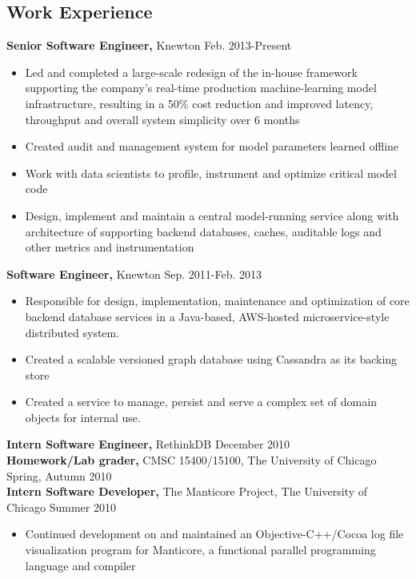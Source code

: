 \documentclass[line,overlapped]{res}
\begin{document}

\address{jordanthelewis@gmail.com \hspace{1.63in} 325 E. 16th St. Apt. 2, Brooklyn, NY 11226}


\newsectionwidth{.2in}
\begin{resume}

\section{Work Experience}
{\bf Senior Software Engineer,} Knewton \hfill Feb. 2013-Present
\begin{itemize} \itemsep -2pt
    \item Led and completed a large-scale redesign of the in-house framework supporting the company's real-time production machine-learning model infrastructure, resulting in a 50\% cost reduction and improved latency, throughput and overall system simplicity over 6 months
    \item Created audit and management system for model parameters learned offline
    \item Work with data scientists to profile, instrument and optimize critical model code
    \item Design, implement and maintain a central model-running service along with architecture of supporting backend databases, caches, auditable logs and other metrics and instrumentation
\end{itemize}
\vspace{-10pt}
{\bf Software Engineer,} Knewton \hfill Sep. 2011-Feb. 2013
\begin{itemize} \itemsep -2pt
    \item Responsible for design, implementation, maintenance and optimization of core backend database services in a Java-based, AWS-hosted microservice-style distributed system.
    \item Created a scalable versioned graph database using Cassandra as its backing store
    \item Created a service to manage, persist and serve a complex set of domain objects for internal use.
\end{itemize}
\vspace{-10pt}
{\bf Intern Software Engineer,} RethinkDB \hfill December 2010\\
{\bf Homework/Lab grader,} CMSC 15400/15100, The University of Chicago \hfill Spring, Autumn 2010\\
{\bf Intern Software Developer,} The Manticore Project, The University of Chicago \hfill Summer 2010
\begin{itemize} \itemsep -2pt
    \item Continued development on and maintained an Objective-C++/Cocoa log file visualization program for Manticore, a functional parallel programming language and compiler
\end{itemize}


\end{resume}
\end{document}
